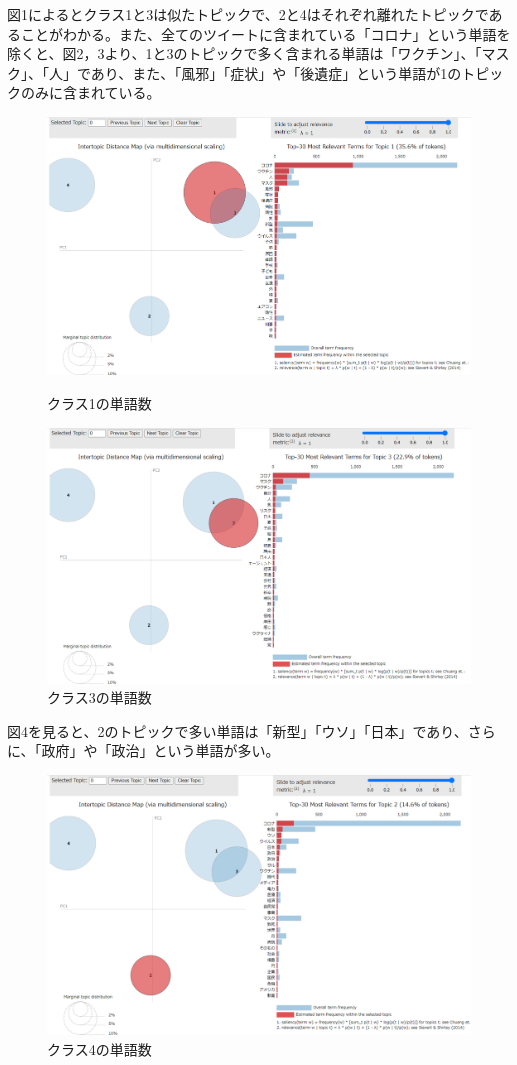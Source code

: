 \documentclass[a4paper, 11pt, titlepage]{jsarticle}
\begin{document}
\newpage
図1によるとクラス1と3は似たトピックで、2と4はそれぞれ離れたトピックであることがわかる。また、全てのツイートに含まれている「コロナ」という単語を除くと、図2，3より、1と3のトピックで多く含まれる単語は「ワクチン」、「マスク」、「人」であり、また、「風邪」「症状」や「後遺症」という単語が1のトピックのみに含まれている。\\
\begin{figure}[H]
  \centering
  \includegraphics[scale=0.25]{picture2.png}
  \caption{クラス1の単語数}
  \centering
  \includegraphics[scale=0.25]{picture3.png}
  \caption{クラス3の単語数}
\end{figure}
\newpage
図4を見ると、2のトピックで多い単語は「新型」「ウソ」「日本」であり、さらに、「政府」や「政治」という単語が多い。\\
\begin{figure}[H]
  \centering
  \includegraphics[scale=0.25]{picture4.png}
  \caption{クラス4の単語数}
\end{figure}
\end{document}
